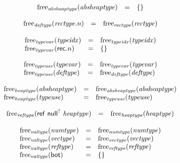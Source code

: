 $$
\begin{array}[t]{@{}lcl@{}l@{}}
{\mathrm{free}}_{\mathit{absheaptype}}({\mathit{absheaptype}}) & = & \{  \} \\
\end{array}
$$

$$
\begin{array}[t]{@{}lcl@{}l@{}}
{\mathrm{free}}_{\mathit{deftype}}({\mathit{rectype}} {.} n) & = & {\mathrm{free}}_{\mathit{rectype}}({\mathit{rectype}}) \\
\end{array}
$$

$$
\begin{array}[t]{@{}lcl@{}l@{}}
{\mathrm{free}}_{\mathit{typevar}}({\mathit{typeidx}}) & = & {\mathrm{free}}_{\mathit{typeidx}}({\mathit{typeidx}}) \\
{\mathrm{free}}_{\mathit{typevar}}(\mathsf{rec} {.} n) & = & \{  \} \\
\end{array}
$$

$$
\begin{array}[t]{@{}lcl@{}l@{}}
{\mathrm{free}}_{\mathit{typeuse}}({\mathit{typevar}}) & = & {\mathrm{free}}_{\mathit{typevar}}({\mathit{typevar}}) \\
{\mathrm{free}}_{\mathit{typeuse}}({\mathit{deftype}}) & = & {\mathrm{free}}_{\mathit{deftype}}({\mathit{deftype}}) \\
\end{array}
$$

$$
\begin{array}[t]{@{}lcl@{}l@{}}
{\mathrm{free}}_{\mathit{heaptype}}({\mathit{absheaptype}}) & = & {\mathrm{free}}_{\mathit{absheaptype}}({\mathit{absheaptype}}) \\
{\mathrm{free}}_{\mathit{heaptype}}({\mathit{typeuse}}) & = & {\mathrm{free}}_{\mathit{typeuse}}({\mathit{typeuse}}) \\
\end{array}
$$

$$
\begin{array}[t]{@{}lcl@{}l@{}}
{\mathrm{free}}_{\mathit{reftype}}(\mathsf{ref}~{\mathsf{null}^?}~{\mathit{heaptype}}) & = & {\mathrm{free}}_{\mathit{heaptype}}({\mathit{heaptype}}) \\
\end{array}
$$

$$
\begin{array}[t]{@{}lcl@{}l@{}}
{\mathrm{free}}_{\mathit{valtype}}({\mathit{numtype}}) & = & {\mathrm{free}}_{\mathit{numtype}}({\mathit{numtype}}) \\
{\mathrm{free}}_{\mathit{valtype}}({\mathit{vectype}}) & = & {\mathrm{free}}_{\mathit{vectype}}({\mathit{vectype}}) \\
{\mathrm{free}}_{\mathit{valtype}}({\mathit{reftype}}) & = & {\mathrm{free}}_{\mathit{reftype}}({\mathit{reftype}}) \\
{\mathrm{free}}_{\mathit{valtype}}(\mathsf{bot}) & = & \{  \} \\
\end{array}
$$

